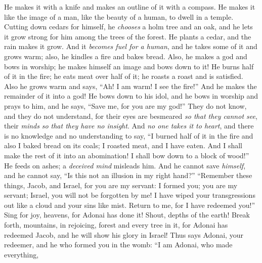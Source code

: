 \begin{biblechapter}
He makes it with a knife 
and makes an outline of it with a compass. 
He makes it like the image of a man, 
like the beauty of a human, to dwell in a temple.
\verse Cutting down cedars for himself, 
he \textit{chooses} a holm tree and an oak, 
and he lets it grow strong for him among the trees of the forest. 
He plants a cedar, and the rain makes it grow.
\verse And it \textit{becomes fuel for a human}, 
and he takes some of it and grows warm; 
also, he kindles a fire and bakes bread. 
Also, he makes a god and bows in worship; 
he makes himself an image and bows down to it!
\verse He burns half of it in the fire; 
he eats meat over half of it; 
he roasts a roast and is satisfied. 
Also he grows warm and says, “Ah! 
I am warm! I see the fire!”
\verse And he makes the remainder of it into a god! 
He bows down to his idol, 
and he bows in worship and prays to him, 
and he says, “Save me, for you are my god!”
\verse They do not know, 
and they do not understand, 
for their eyes are besmeared \textit{so that they cannot see}, 
their \textit{minds} \textit{so that they have no insight}.
\verse And \textit{no one takes it to heart}, and there is no knowledge 
and no understanding to say, “I burned half of it in the fire 
and also I baked bread on its coals; 
I roasted meat, and I have eaten. 
And I shall make the rest of it into an abomination! 
I shall bow down to a block of wood!”
\verse He feeds on ashes; a \textit{deceived mind} misleads him. 
And he cannot save \textit{himself}, and he cannot say, 
“Is this not an illusion in my right hand?”
 “Remember these things, Jacob, 
and Israel, for you are my servant: 
I formed you; you are my servant; 
Israel, you will not be forgotten by me!
\verse I have wiped your transgressions out like a cloud 
and your sins like mist. 
Return to me, 
for I have redeemed you!”
\verse Sing for joy, heavens, for Adonai has done it! 
Shout, depths of the earth! 
Break forth, mountains, in rejoicing, 
forest and every tree in it, 
for Adonai has redeemed Jacob, 
and he will show his glory in Israel!
 Thus says Adonai, your redeemer, 
and he who formed you in the womb: 
“I am Adonai, who made everything, 

\end{biblechapter}
